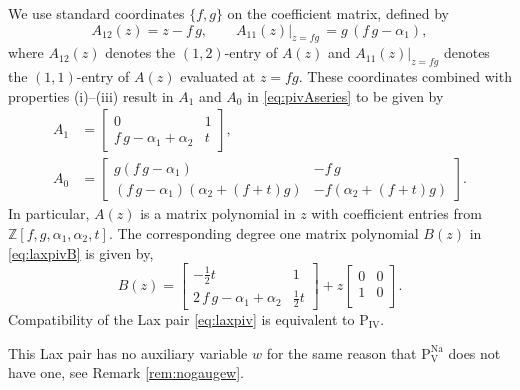 \documentclass[a4paper,reqno]{amsart}
\numberwithin{equation}{section}
\numberwithin{figure}{section}
\theoremstyle{remark}
\newcommand\Pfour{\textrm{P}_{\textrm{IV}}}
\newcommand\Pfive{\textrm{P}_{\textrm{V}}}
\begin{document}
We use standard coordinates $\{f,g\}$ on the coefficient matrix, defined by 
\begin{equation*}
    A_{12}(z)=z-f\,g,\qquad A_{11}(z)|_{z=fg}\,=g\,(f\,g-\alpha_1),
\end{equation*}
where $A_{12}(z)$ denotes the $(1,2)$-entry of $A(z)$ and $A_{11}(z)|_{z=fg}$ denotes the $(1,1)$-entry of $A(z)$ evaluated at $z=fg$. 
These coordinates combined with properties (i)--(iii) result in $A_1$ and $A_0$ in \eqref{eq:pivAseries} to be given by
\begin{align*}
A_1&=\begin{bmatrix}
 0 & 1\\
f\,g-\alpha_1+\alpha_2 & t
\end{bmatrix},\\
A_0&=\begin{bmatrix}
g(f\,g-\alpha_1) & -f\,g\\
(f\,g-\alpha_1)(\alpha_2+(f+t)g) & -f(\alpha_2+(f+t)g)
\end{bmatrix}.
\end{align*}
In particular, $A(z)$ is a matrix polynomial in $z$ with coefficient entries from $\mathbb{Z}[f,g,\alpha_1,\alpha_2,t]$.
The corresponding degree one matrix polynomial $B(z)$ in \eqref{eq:laxpivB} is given by,
\begin{equation*}
    B(z)=\begin{bmatrix}
 -\frac{1}{2}t & 1\\
 2\,f\,g-\alpha_1+\alpha_2 & \frac{1}{2}t
\end{bmatrix}+z\begin{bmatrix}
 0 & 0 \\
 1 & 0\\
\end{bmatrix}.
\end{equation*}
Compatibility of the Lax pair \eqref{eq:laxpiv} is equivalent to $\Pfour$.

This Lax pair has no auxiliary variable $w$ for the same reason that $\Pfive^\text{Na}$ does not have one, see Remark \ref{rem:nogaugew}.
\end{document}
